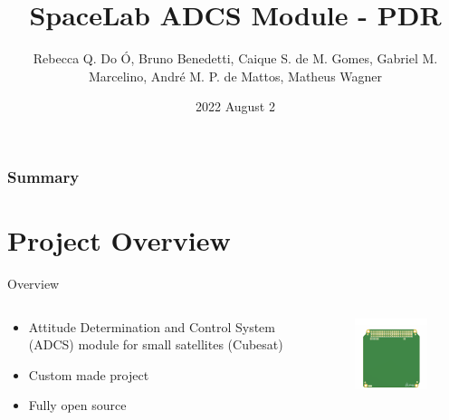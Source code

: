 \documentclass{beamer}
\title[Presentation]{SpaceLab ADCS Module - PDR}
\author[SpaceLab]{Rebecca Q. Do Ó, Bruno Benedetti, Caique S. de M. Gomes, Gabriel M. Marcelino, André M. P. de Mattos, Matheus Wagner}
\institute[]{SpaceLab - UFSC}
\date{2022 August 2}
\begin{document}
    
    
    
    \begin{frame}
        \titlepage
    \end{frame}

    \begin{frame}
        \frametitle{Summary}
        \tableofcontents
    \end{frame}
    
    \section{Project Overview}

        
        
    \begin{frame}{Overview}

    \begin{columns}[t]
        \begin{column}[t]{0.5\textwidth}
            \begin{itemize}
                \item Attitude Determination and Control System (ADCS) module for small satellites (Cubesat)
                \vspace{0.3cm}
                \item Custom made project
                \vspace{0.3cm}
                \item Fully open source

            \end{itemize}
        \end{column}
        \begin{column}[t]{0.5\textwidth}
            \begin{figure}[!ht]
                \begin{center}
                    \includegraphics[width=5.5cm]{figures/pcb_adcs.png}
                \end{center}
            \end{figure}
        \end{column}
    \end{columns}

\end{frame}
\end{document}
